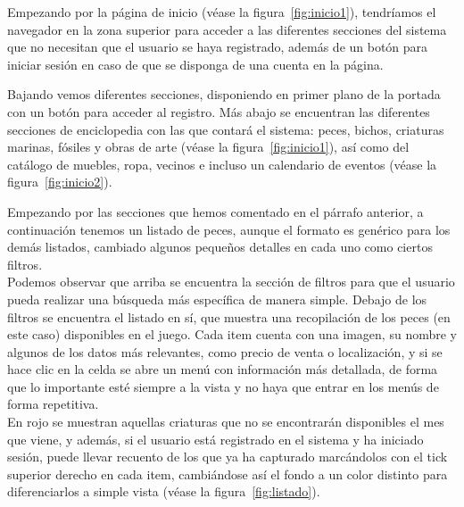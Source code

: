 Empezando por la página de inicio (v\'ease la figura~\ref{fig:inicio1}), tendríamos el navegador en la zona superior para acceder a las diferentes secciones del sistema que no necesitan que el usuario se haya registrado, además de un botón para iniciar sesión en caso de que se disponga de una cuenta en la página.\\



Bajando vemos diferentes secciones, disponiendo en primer plano de la portada con un botón para acceder al registro. Más abajo se encuentran las diferentes secciones de enciclopedia con las que contará el sistema: peces, bichos, criaturas marinas, fósiles y obras de arte (v\'ease la figura~\ref{fig:inicio1}), así como del catálogo de muebles, ropa, vecinos e incluso un calendario de eventos {(v\'ease la figura~\ref{fig:inicio2})}.\\


Empezando por las secciones que hemos comentado en el párrafo anterior, a continuación tenemos un listado de peces, aunque el formato es genérico para los demás listados, cambiado algunos pequeños detalles en cada uno como ciertos filtros.\\

Podemos observar que arriba se encuentra la sección de filtros para que el usuario pueda realizar una búsqueda más específica de manera simple. Debajo de los filtros se encuentra el listado en sí, que muestra una recopilación de los peces (en este caso) disponibles en el juego. Cada item cuenta con una imagen, su nombre y algunos de los datos más relevantes, como precio de venta o localización, y si se hace clic en la celda se abre un menú con información más detallada, de forma que lo importante esté siempre a la vista y no haya que entrar en los menús de forma repetitiva.\\
 
En rojo se muestran aquellas criaturas que no se encontrarán disponibles el mes que viene, y además, si el usuario está registrado en el sistema y ha iniciado sesión, puede llevar recuento de los que ya ha capturado marcándolos con el tick superior derecho en cada item, cambiándose así el fondo a un color distinto para diferenciarlos a simple vista {(v\'ease la figura~\ref{fig:listado})}.\\


